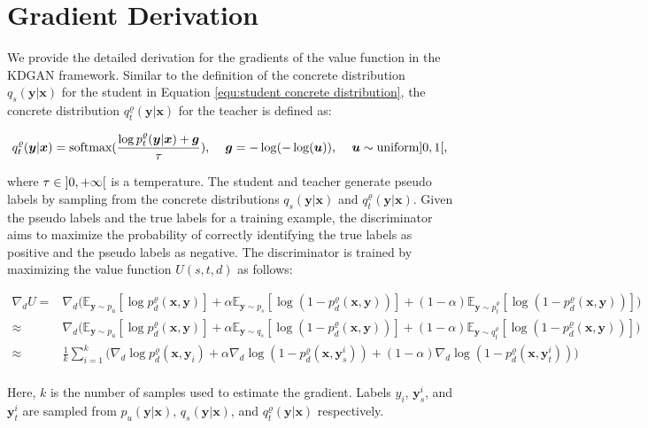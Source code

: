 \documentclass{article}
\newcommand{\OVEC}[1]{\bm{#1}} %
\newcommand{\SVEC}[1]{\bm{#1}} %
\newcommand{\EXP}{\mathbb{E}} %
\newcommand{\kdganabbrobj}{U}
\newcommand{\kdganfullobj}{U(s,t,d)}
\newcommand{\abbrpdat}{p_{u}}
\newcommand{\fullpdat}{p_{u}(\OVEC{y}|\OVEC{x})}
\newcommand{\abbrpstd}{p_{s}}
\newcommand{\abbrqstd}{q_{s}}
\newcommand{\fullqstd}[1]{q_{s}(#1|\OVEC{x})}
\newcommand{\abbrptch}{p_{t}^{\varrho}}
\newcommand{\abbrqtch}{q_{t}^{\varrho}}
\newcommand{\fullptch}[1]{p_{t}^{\varrho}(#1|\OVEC{x})}
\newcommand{\fullqtch}[1]{q_{t}^{\varrho}(#1|\OVEC{x})}
\newcommand{\fullpdis}[1]{p_{d}^{\varrho}(\OVEC{x},#1)}
\begin{document}
\section{Gradient Derivation} \label{app:gradient}

We provide the detailed derivation for the gradients of the value function in the KDGAN framework.
Similar to the definition of the concrete distribution $\fullqstd{\OVEC{y}}$ for the student in Equation \ref{equ:student concrete distribution}, the concrete distribution $\fullqtch{\OVEC{y}}$ for the teacher is defined as:
\begin{small}
\begin{equation*} \label{equ:teacher concrete distribution}
\begin{aligned}
\fullqtch{\OVEC{y}}
=
\text{softmax}(\frac{\log\fullptch{\OVEC{y}}+\OVEC{g}}{\tau})
\text{, }
\quad
\OVEC{g}=-\log(-\log(\OVEC{u}))
\text{, }
\quad
\OVEC{u}\sim\text{uniform}\interval[open left, open right]{0}{1}
\text{,}
\end{aligned}
\end{equation*}
\end{small}%
where $\tau\in\interval[open left, open right]{0}{+\infty}$ is a temperature.
The student and teacher generate pseudo labels by sampling from the concrete distributions $\fullqstd{\OVEC{y}}$ and $\fullqtch{\OVEC{y}}$.
Given the pseudo labels and the true labels for a training example, the discriminator aims to maximize the probability of correctly identifying the true labels as positive and the pseudo labels as negative.
The discriminator is trained by maximizing the value function $\kdganfullobj$ as follows:
\begin{small}
\begin{equation*}
\begin{aligned}
\nabla_{d}
\kdganabbrobj
=
&
\nabla_{d}
\big(
\EXP_{\OVEC{y}\sim\abbrpdat}[\log\fullpdis{\OVEC{y}}]
+
\alpha
\EXP_{\OVEC{y}\sim\abbrpstd}[\log(1-\fullpdis{\OVEC{y}})]
+
(1 - \alpha)
\EXP_{\OVEC{y}\sim\abbrptch}[\log(1-\fullpdis{\OVEC{y}})]
\big)
\\
\approx
&
\nabla_{d}
\big(
\EXP_{\OVEC{y}\sim\abbrpdat}[\log\fullpdis{\OVEC{y}}]
+
\alpha
\EXP_{\OVEC{y}\sim\abbrqstd}[\log(1-\fullpdis{\OVEC{y}})]
+
(1 - \alpha)
\EXP_{\OVEC{y}\sim\abbrqtch}[\log(1-\fullpdis{\OVEC{y}})]
\big)
\\
\approx
&
{\textstyle\frac{1}{k}}
{\textstyle\sum}_{i=1}^{k}
\big(
\nabla_{d}
\log\fullpdis{\OVEC{y}_{i}}
+
\alpha\nabla_{d}\log(1-\fullpdis{\SVEC{y}^{i}_{s}})
+
(1-\alpha)\nabla_{d}\log(1-\fullpdis{\SVEC{y}^{i}_{t}})
\big)
\\
\end{aligned}
\end{equation*}
\end{small}%
Here, $k$ is the number of samples used to estimate the gradient.
Labels $y_{i}$, $\SVEC{y}^{i}_{s}$, and $\SVEC{y}^{i}_{t}$ are sampled from $\fullpdat$, $\fullqstd{\OVEC{y}}$, and $\fullqtch{\OVEC{y}}$ respectively.
\end{document}
